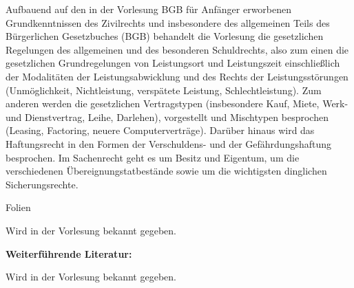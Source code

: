 \begin{course}
\begin{learningoutcomes}
\end{learningoutcomes}

\begin{content}
Aufbauend auf den in der Vorlesung BGB für Anfänger
erworbenen Grundkenntnissen des Zivilrechts und insbesondere des
allgemeinen Teils des Bürgerlichen Gesetzbuches (BGB)
behandelt die Vorlesung die gesetzlichen Regelungen des allgemeinen
und des besonderen Schuldrechts, also zum einen die gesetzlichen
Grundregelungen von Leistungsort und Leistungszeit
einschließlich der Modalitäten der Leistungsabwicklung
und des Rechts der Leistungsstörungen (Unmöglichkeit,
Nichtleistung, verspätete Leistung, Schlechtleistung). Zum
anderen werden die gesetzlichen Vertragstypen (insbesondere Kauf,
Miete, Werk- und Dienstvertrag, Leihe, Darlehen), vorgestellt und
Mischtypen besprochen (Leasing, Factoring, neuere
Computerverträge). Darüber hinaus wird das Haftungsrecht
in den Formen der Verschuldens- und der Gefährdungshaftung
besprochen. Im Sachenrecht geht es um Besitz und Eigentum, um die
verschiedenen Übereignungstatbestände sowie um die
wichtigsten dinglichen Sicherungsrechte.
\end{content}

\begin{media}Folien\end{media}

\begin{literature}Wird in der Vorlesung bekannt gegeben.

\textbf{Weiterführende Literatur:}

Wird in der Vorlesung bekannt gegeben.

\end{literature}



\end{course}